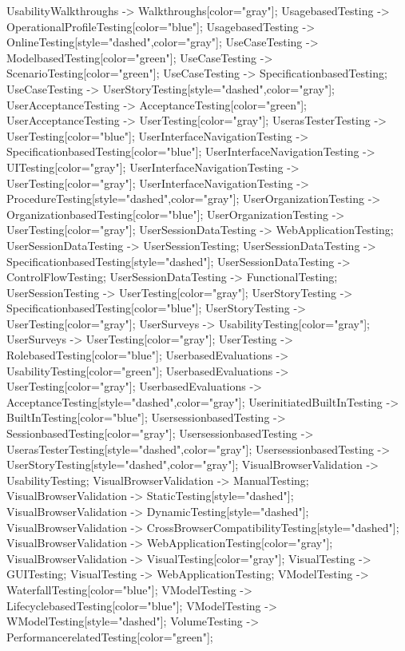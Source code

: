 \documentclass{article}
\begin{document}
{UsabilityWalkthroughs -> Walkthroughs[color="gray"];
UsagebasedTesting -> OperationalProfileTesting[color="blue"];
UsagebasedTesting -> OnlineTesting[style="dashed",color="gray"];
UseCaseTesting -> ModelbasedTesting[color="green"];
UseCaseTesting -> ScenarioTesting[color="green"];
UseCaseTesting -> SpecificationbasedTesting;
UseCaseTesting -> UserStoryTesting[style="dashed",color="gray"];
UserAcceptanceTesting -> AcceptanceTesting[color="green"];
UserAcceptanceTesting -> UserTesting[color="gray"];
UserasTesterTesting -> UserTesting[color="blue"];
UserInterfaceNavigationTesting -> SpecificationbasedTesting[color="blue"];
UserInterfaceNavigationTesting -> UITesting[color="gray"];
UserInterfaceNavigationTesting -> UserTesting[color="gray"];
UserInterfaceNavigationTesting -> ProcedureTesting[style="dashed",color="gray"];
UserOrganizationTesting -> OrganizationbasedTesting[color="blue"];
UserOrganizationTesting -> UserTesting[color="gray"];
UserSessionDataTesting -> WebApplicationTesting;
UserSessionDataTesting -> UserSessionTesting;
UserSessionDataTesting -> SpecificationbasedTesting[style="dashed"];
UserSessionDataTesting -> ControlFlowTesting;
UserSessionDataTesting -> FunctionalTesting;
UserSessionTesting -> UserTesting[color="gray"];
UserStoryTesting -> SpecificationbasedTesting[color="blue"];
UserStoryTesting -> UserTesting[color="gray"];
UserSurveys -> UsabilityTesting[color="gray"];
UserSurveys -> UserTesting[color="gray"];
UserTesting -> RolebasedTesting[color="blue"];
UserbasedEvaluations -> UsabilityTesting[color="green"];
UserbasedEvaluations -> UserTesting[color="gray"];
UserbasedEvaluations -> AcceptanceTesting[style="dashed",color="gray"];
UserinitiatedBuiltInTesting -> BuiltInTesting[color="blue"];
UsersessionbasedTesting -> SessionbasedTesting[color="gray"];
UsersessionbasedTesting -> UserasTesterTesting[style="dashed",color="gray"];
UsersessionbasedTesting -> UserStoryTesting[style="dashed",color="gray"];
VisualBrowserValidation -> UsabilityTesting;
VisualBrowserValidation -> ManualTesting;
VisualBrowserValidation -> StaticTesting[style="dashed"];
VisualBrowserValidation -> DynamicTesting[style="dashed"];
VisualBrowserValidation -> CrossBrowserCompatibilityTesting[style="dashed"];
VisualBrowserValidation -> WebApplicationTesting[color="gray"];
VisualBrowserValidation -> VisualTesting[color="gray"];
VisualTesting -> GUITesting;
VisualTesting -> WebApplicationTesting;
VModelTesting -> WaterfallTesting[color="blue"];
VModelTesting -> LifecyclebasedTesting[color="blue"];
VModelTesting -> WModelTesting[style="dashed"];
VolumeTesting -> PerformancerelatedTesting[color="green"];
}
\end{document}
